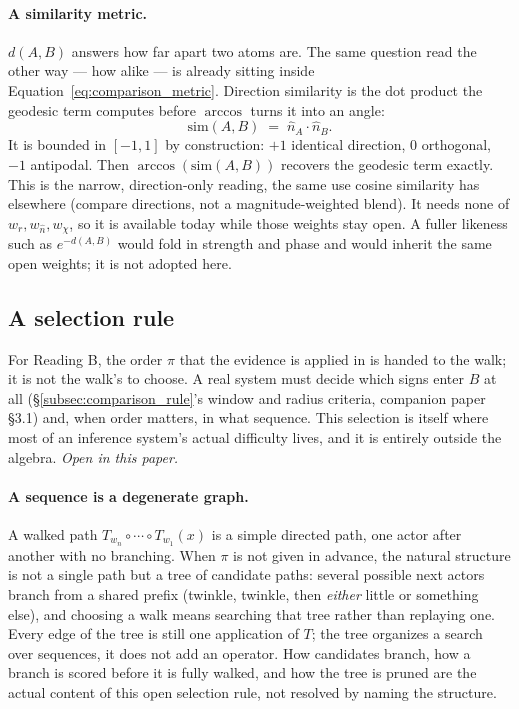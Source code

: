 \documentclass[12pt, a4paper]{article}
\begin{document}
\paragraph{A similarity metric.}
$d(A,B)$ answers how far apart two atoms are. The same question
read the other way --- how alike --- is already sitting inside
Equation~\eqref{eq:comparison_metric}. Direction similarity is the
dot product the geodesic term computes before $\arccos$ turns it
into an angle:
\begin{equation}
    \mathrm{sim}(A,B) \;=\; \hat n_A\cdot\hat n_B.
    \label{eq:direction_similarity}
\end{equation}
It is bounded in $[-1,1]$ by construction: $+1$ identical
direction, $0$ orthogonal, $-1$ antipodal. Then
$\arccos(\mathrm{sim}(A,B))$ recovers the geodesic term exactly.
This is the narrow, direction-only reading, the same use cosine
similarity has elsewhere (compare directions, not a
magnitude-weighted blend). It needs none of
$w_r,w_{\hat n},w_\chi$, so it is available today while those
weights stay open. A fuller likeness such as $e^{-d(A,B)}$ would
fold in strength and phase and would inherit the same open
weights; it is not adopted here.

\subsection{A selection rule}
\label{subsec:selection_rule}
For Reading B, the order $\pi$ that the evidence is applied in is
handed to the walk; it is not the walk's to choose. A real system must
decide which signs enter $B$ at all (\S\ref{subsec:comparison_rule}'s
window and radius criteria, companion paper \S3.1) and, when order
matters, in what sequence. This selection is itself where most of an
inference system's actual difficulty lives, and it is entirely outside
the algebra. \emph{Open in this paper.}

\paragraph{A sequence is a degenerate graph.} A walked path
$T_{w_n}\circ\cdots\circ T_{w_1}(x)$ is a simple directed path, one
actor after another with no branching. When $\pi$ is not given in
advance, the natural structure is not a single path but a tree of
candidate paths: several possible next actors branch from a shared
prefix (twinkle, twinkle, then \emph{either} little or something
else), and choosing a walk means searching that tree rather than
replaying one. Every edge of the tree is still one application of
$T$; the tree organizes a search over sequences, it does not add an
operator. How candidates branch, how a branch is scored before it is
fully walked, and how the tree is pruned are the actual content of
this open selection rule, not resolved by naming the structure.
\end{document}
